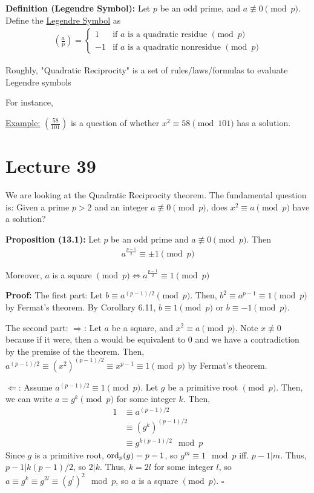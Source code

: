 \documentclass{article}
\newcommand*{\qed}{\hfill$\square$}%
\begin{document}
\textbf{Definition (Legendre Symbol):} Let $p$ be an odd prime, and $a\not\equiv 0\pmod p$. Define the \underline{Legendre Symbol} as \begin{align*}
    (\frac{a}{p})=\begin{cases}
        1 & \text{if }a\text{ is a quadratic residue }\pmod p\\
        -1 & \text{if }a\text{ is a quadratic nonresidue }\pmod p
    \end{cases}
\end{align*}

Roughly, "Quadratic Reciprocity" is a set of rules/laws/formulas to evaluate Legendre symbols

For instance,

\underline{Example:} $(\frac{58}{101})$ is a question of whether $x^2\equiv 58\pmod{101}$ has a solution.

\section{Lecture 39}

We are looking at the Quadratic Reciprocity theorem. The fundamental question is: Given a prime $p>2$ and an integer $a\not\equiv 0\pmod p$, does $x^2\equiv a\pmod p$ have a solution? 

\textbf{Proposition (13.1):} Let $p$ be an odd prime and $a\not\equiv 0\pmod p$. Then \begin{align*}
    a^{\frac{p-1}{2}}\equiv \pm 1\pmod p
\end{align*}

Moreover, $a$ is a square $\pmod p\iff a^{\frac{p-1}{2}}\equiv 1\pmod p$

\textbf{Proof:} The first part: Let $b\equiv a^{(p-1)/2}\pmod p$. Then, $b^2\equiv a^{p-1}\equiv 1\pmod p$ by Fermat's theorem. By Corollary 6.11, $b\equiv 1\pmod p$ or $b\equiv -1\pmod p$.

The second part: $\Rightarrow$: Let $a$ be a square, and $x^2\equiv a\pmod p$. Note $x\not\equiv 0$ because if it were, then a would be equivalent to 0 and we have a contradiction by the premise of the theorem. Then, $a^{(p-1)/2}\equiv (x^2)^{(p-1)/2}\equiv x^{p-1}\equiv 1\pmod p$ by Fermat's theorem.

$\Leftarrow$: Assume $a^{(p-1)/2}\equiv 1\pmod p$. Let $g$ be a primitive root $\pmod p$. Then, we can write $a\equiv g^k\pmod p$ for some integer $k$. Then, \begin{align*}
    1&\equiv a^{(p-1)/2}\\
    &\equiv (g^k)^{(p-1)/2}\\
    &\equiv g^{k(p-1)/2}\mod p
\end{align*}Since $g$ is a primitive root, $\text{ord}_p(g)=p-1$, so $g^m\equiv 1\mod p$ iff. $p-1|m$. Thus, $p-1|k(p-1)/2$, so $2|k$. Thus, $k=2l$ for some integer $l$, so $a\equiv g^k\equiv g^{2l}\equiv (g^l)^2\mod p$, so $a$ is a square $\pmod p$. \qed
\end{document}
